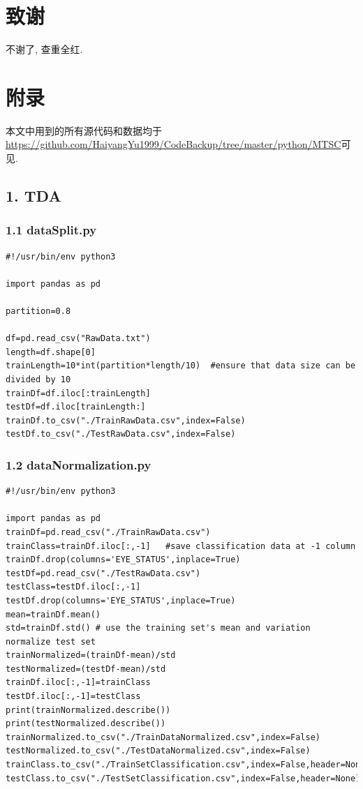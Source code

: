 \documentclass[12pt]{ctexart}
\begin{document}
\newpage
{}
\setcounter{page}{1}
\section*{致谢}
不谢了, 查重全红.

\newpage
{}
\setcounter{page}{1}
\section*{附录}
本文中用到的所有源代码和数据均于\url{https://github.com/HaiyangYu1999/CodeBackup/tree/master/python/MTSC}可见.
\subsection*{1. TDA}
\subsubsection*{1.1 dataSplit.py}
\begin{scriptsize}
\begin{verbatim}
#!/usr/bin/env python3

import pandas as pd

partition=0.8

df=pd.read_csv("RawData.txt")
length=df.shape[0]
trainLength=10*int(partition*length/10)  #ensure that data size can be divided by 10
trainDf=df.iloc[:trainLength]
testDf=df.iloc[trainLength:]
trainDf.to_csv("./TrainRawData.csv",index=False)
testDf.to_csv("./TestRawData.csv",index=False)
\end{verbatim}
\end{scriptsize}
\subsubsection*{1.2 dataNormalization.py}
\begin{scriptsize}
\begin{verbatim}
#!/usr/bin/env python3

import pandas as pd
trainDf=pd.read_csv("./TrainRawData.csv")
trainClass=trainDf.iloc[:,-1]   #save classification data at -1 column
trainDf.drop(columns='EYE_STATUS',inplace=True)
testDf=pd.read_csv("./TestRawData.csv")
testClass=testDf.iloc[:,-1]
testDf.drop(columns='EYE_STATUS',inplace=True)
mean=trainDf.mean()
std=trainDf.std() # use the training set's mean and variation normalize test set
trainNormalized=(trainDf-mean)/std
testNormalized=(testDf-mean)/std
trainDf.iloc[:,-1]=trainClass
testDf.iloc[:,-1]=testClass
print(trainNormalized.describe())
print(testNormalized.describe())
trainNormalized.to_csv("./TrainDataNormalized.csv",index=False)
testNormalized.to_csv("./TestDataNormalized.csv",index=False)
trainClass.to_csv("./TrainSetClassification.csv",index=False,header=None)
testClass.to_csv("./TestSetClassification.csv",index=False,header=None)
\end{verbatim}
\end{scriptsize}
\end{document}
